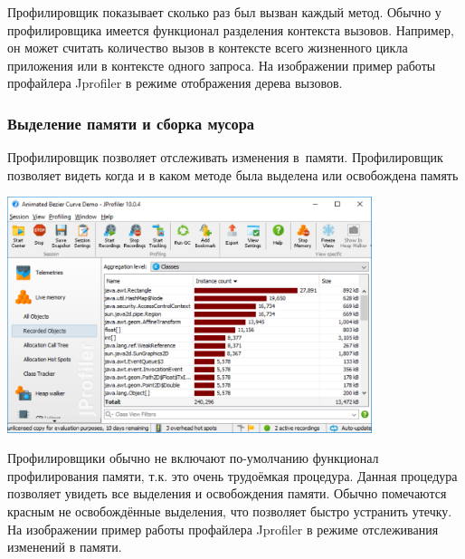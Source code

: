 \documentclass{../industrial-development}
\begin{document}
\lecturenotes
Профилировщик показывает сколько раз был вызван каждый метод. Обычно у профилировщика имеется функционал разделения контекста вызовов. Например, он может считать количество вызов в контексте всего жизненного цикла приложения или в контексте одного запроса. На изображении пример работы профайлера Jprofiler в режиме отображения дерева вызовов.

\begin{frame} \frametitle{Выделение памяти и сборка мусора}
	\begin{block}{}
		Профилировщик позволяет \alert{отслеживать изменения в~памяти}. Профилировщик позволяет видеть когда и в каком методе была выделена или освобождена память
	\end{block}
	\centerline{\includegraphics[width=0.8\textwidth]{memory.pdf}}
\end{frame}

\lecturenotes
Профилировщики обычно не включают по-умолчанию функционал профилирования памяти, т.к. это очень трудоёмкая процедура. Данная процедура позволяет увидеть все выделения и освобождения памяти. Обычно помечаются красным не освобождённые выделения, что позволяет быстро устранить утечку. На изображении пример работы профайлера Jprofiler в режиме отслеживания изменений в памяти.
\end{document}
